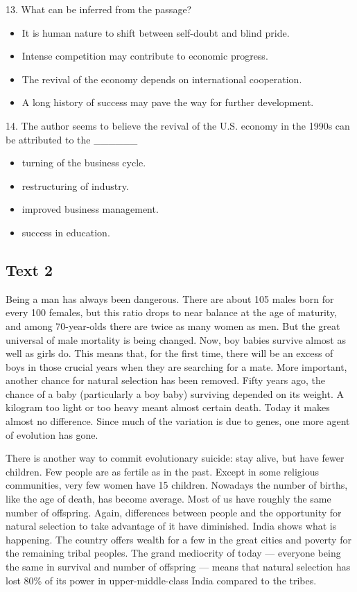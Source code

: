 \documentclass[UTF8,11pt]{ctexart}
\begin{document}
13. What can be inferred from the passage?


\begin{itemize}[leftmargin=2em,itemsep=.2em,topsep=.4em]\item[A.] It is human nature to shift between self-doubt and blind pride.
\item[B.] Intense competition may contribute to economic progress.
\item[C.] The revival of the economy depends on international cooperation.
\item[D.] A long history of success may pave the way for further development.
\end{itemize}

14. The author seems to believe the revival of the U.S. economy in the 1990s can be attributed to the \_\_\_\_\_\_


\begin{itemize}[leftmargin=2em,itemsep=.2em,topsep=.4em]\item[A.] turning of the business cycle.
\item[B.] restructuring of industry.
\item[C.] improved business management.
\item[D.] success in education.
\end{itemize}

\subsection*{\textbf{Text 2}}


Being a man has always been dangerous. There are about 105 males born for every 100 females, but this ratio drops to near balance at the age of maturity, and among 70-year-olds there are twice as many women as men. But the great universal of male mortality is being changed. Now, boy babies survive almost as well as girls do. This means that, for the first time, there will be an excess of boys in those crucial years when they are searching for a mate. More important, another chance for natural selection has been removed. Fifty years ago, the chance of a baby (particularly a boy baby) surviving depended on its weight. A kilogram too light or too heavy meant almost certain death. Today it makes almost no difference. Since much of the variation is due to genes, one more agent of evolution has gone.


There is another way to commit evolutionary suicide: stay alive, but have fewer children. Few people are as fertile as in the past. Except in some religious communities, very few women have 15 children. Nowadays the number of births, like the age of death, has become average. Most of us have roughly the same number of offspring. Again, differences between people and the opportunity for natural selection to take advantage of it have diminished. India shows what is happening. The country offers wealth for a few in the great cities and poverty for the remaining tribal peoples. The grand mediocrity of today — everyone being the same in survival and number of offspring — means that natural selection has lost 80\% of its power in upper-middle-class India compared to the tribes.
\end{document}
